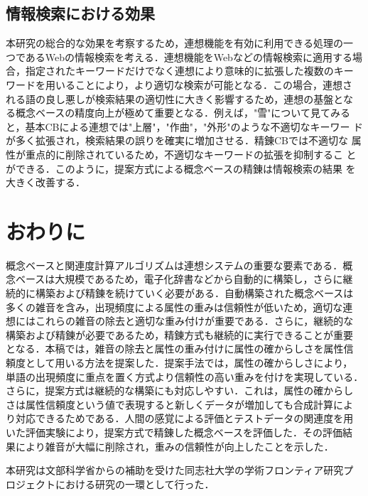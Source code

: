 \subsection{情報検索における効果}

本研究の総合的な効果を考察するため，連想機能を有効に利用できる処理の一
つであるWebの情報検索を考える．連想機能をWebなどの情報検索に適用する場
合，指定されたキーワードだけでなく連想により意味的に拡張した複数のキー
ワードを用いることにより，より適切な検索が可能となる．この場合，連想さ
れる語の良し悪しが検索結果の適切性に大きく影響するため，連想の基盤とな
る概念ベースの精度向上が極めて重要となる．例えば，"雪"について見てみる
と，基本CBによる連想では"上層"，"作曲"，"外形"のような不適切なキーワー
ドが多く拡張され，検索結果の誤りを確実に増加させる．精錬CBでは不適切な
属性が重点的に削除されているため，不適切なキーワードの拡張を抑制するこ
とができる．このように，提案方式による概念ベースの精錬は情報検索の結果
を大きく改善する．

\newpage

\section{おわりに}

概念ベースと関連度計算アルゴリズムは連想システムの重要な要素である．概
念ベースは大規模であるため，電子化辞書などから自動的に構築し，さらに継
続的に構築および精錬を続けていく必要がある．自動構築された概念ベースは
多くの雑音を含み，出現頻度による属性の重みは信頼性が低いため，適切な連
想にはこれらの雑音の除去と適切な重み付けが重要である．さらに，継続的な
構築および精錬が必要であるため，精錬方式も継続的に実行できることが重要
となる．本稿では，雑音の除去と属性の重み付けに属性の確からしさを属性信
頼度として用いる方法を提案した．提案手法では，属性の確からしさにより，
単語の出現頻度に重点を置く方式より信頼性の高い重みを付けを実現している．
さらに，提案方式は継続的な構築にも対応しやすい．これは，属性の確からし
さは属性信頼度という値で表現すると新しくデータが増加しても合成計算によ
り対応できるためである．人間の感覚による評価とテストデータの関連度を用
いた評価実験により，提案方式で精錬した概念ベースを評価した．その評価結
果により雑音が大幅に削除され，重みの信頼性が向上したことを示した．

\acknowledgment
本研究は文部科学省からの補助を受けた同志社大学の学術フロンティア研究プ
ロジェクトにおける研究の一環として行った．





